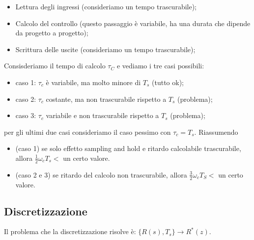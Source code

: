 \begin{landscape}
\begin{multicols*}{2}
\begin{itemize}
        \item Lettura degli ingressi (consideriamo un tempo trascurabile);
        \item Calcolo del controllo (questo passaggio è variabile, ha una durata che dipende da progetto a progetto);
        \item Scrittura delle uscite (consideriamo un tempo trascurabile);
    \end{itemize}
    Consisderiamo il tempo di calcolo $\tau_C$ e vediamo i tre casi possibili:
    \begin{itemize}
        \item caso 1: $\tau_c$ è variabile, ma molto minore di $T_s$ (tutto ok);
        \item caso 2: $\tau_c$ costante, ma non trascurabile rispetto a $T_s$ (problema);
        \item caso 3: $\tau_c$ variabile e non trascurabile rispetto a $T_s$ (problema);
    \end{itemize}
    per gli ultimi due casi consideriamo il caso pessimo con $\tau_c = T_s$. 
    \newline
    \newline
    Riassumendo
    \begin{itemize}
        \item (caso 1) se solo effetto sampling and hold e ritardo calcolabile trascurabile, allora $\frac{1}{2} \omega_c T_s <$ un certo valore.
        \item (caso 2 e 3) se ritardo del calcolo non trascurabile, allora $\frac{3}{2} \omega_c T_S <$ un certo valore.
    \end{itemize}
    \subsection{Discretizzazione}
    Il problema che la discretizzazione risolve è: $\{R(s), T_s\} \rightarrow  R^*(z)$.

\end{multicols*}
\end{landscape}
